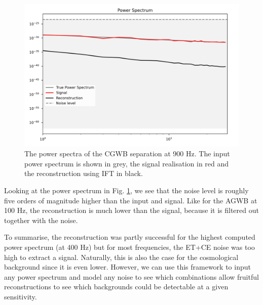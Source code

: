 \begin{figure}
    \centering
    \includegraphics[width=0.8\linewidth]{Images/power_spectrum_cosmo_900Hz_2D.png}
    \caption[The power spectra of the CGWB separation at 900 Hz.]{The power spectra of the CGWB separation at 900 Hz. The input power spectrum is shown in grey, the signal realisation in red and the reconstruction using IFT in black.}
    \label{cosmo_power_spectrum_nifty}
\end{figure} 

Looking at the power spectrum in Fig. \ref{cosmo_power_spectrum_nifty}, we see that the noise level is roughly five orders of magnitude higher than the input and signal. Like for the AGWB at 100 Hz, the reconstruction is much lower than the signal, because it is filtered out together with the noise.

To summarise, the reconstruction was partly successful for the highest computed power spectrum (at 400 Hz) but for most frequencies, the ET+CE noise was too high to extract a signal. Naturally, this is also the case for the cosmological background since it is even lower. However, we can use this framework to input any power spectrum and model any noise to see which combinations allow fruitful reconstructions to see which backgrounds could be detectable at a given sensitivity.